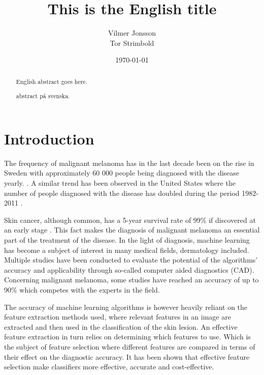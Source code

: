 \documentclass{kththesis}
\title{This is the English title}
\author{Vilmer Jonsson \\ Tor Strimbold}
\date{\today}
\begin{document}
\frontmatter

\titlepage

\begin{abstract}
  English abstract goes here.

  \blindtext
\end{abstract}


\begin{otherlanguage}{swedish}
  \begin{abstract}
    abstract på svenska.
  \end{abstract}
\end{otherlanguage}


\tableofcontents


\mainmatter


\chapter{Introduction}
The frequency of malignant melanoma has in the last decade been on the rise in Sweden with approximately 60 000 people being diagnosed with the disease yearly. \parencite{sverige-hudcancer}.
A similar trend has been observed in the United States where the number of people diagnosed with the disease has doubled during the period 1982-2011 \parencite{aad-skin-cancer}.

Skin cancer, although common, has a 5-year survival rate of 99\% if discovered at an early stage \parencite{skincancer_org_2019}.
This fact makes the diagnosis of malignant melanoma an essential part of the treatment of the disease. In the light of diagnosis, machine learning has become a subject of interest in many medical fields, dermatology included. Multiple studies have been conducted to evaluate the potential of the algorithms’ accuracy and applicability through so-called computer aided diagnostics (CAD). Concerning malignant melanoma, some studies have reached an accuracy of up to 90\% which competes with the experts in the field. %

The accuracy of machine learning algorithms is however heavily reliant on the feature extraction methods used, where relevant features in an image are extracted and then used in the classification of the skin lesion. An effective feature extraction in turn relies on determining which features to use. Which is the subject of feature selection where different features are compared in terms of their effect on the diagnostic accuracy. It has been shown that effective feature selection make classifiers more effective, accurate and cost-effective. \parencite{KarabulutEsraMahsereci2012Acso}
\end{document}
